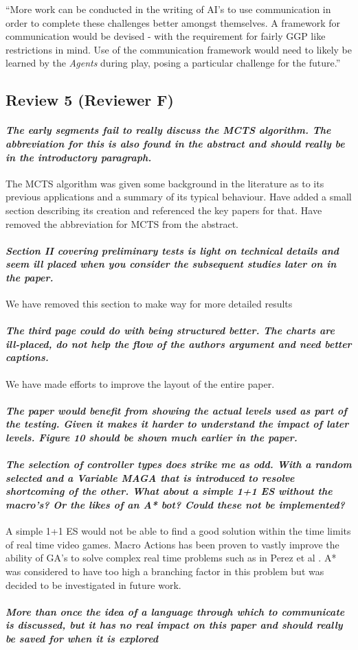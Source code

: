 \documentclass{article}
\begin{document}
``More work can be conducted in the writing of AI's to use communication in order to complete these challenges better amongst themselves. A framework for communication would be devised - with the requirement for fairly GGP like restrictions in mind. Use of the communication framework would need to likely be learned by the \emph{Agents} during play, posing a particular challenge for the future.''
\subsection{Review 5 (Reviewer F)}
\paragraph*{\textit{The early segments fail to really discuss the MCTS algorithm.  The abbreviation for this is also found in the abstract and should really be in the introductory paragraph.}}
The MCTS algorithm was given some background in the literature as to its previous applications and a summary of its typical behaviour. Have added a small section describing its creation and referenced the key papers for that.
Have removed the abbreviation for MCTS from the abstract.
\paragraph*{\textit{Section II covering preliminary tests is light on technical details and seem ill placed when you consider the subsequent studies later on in the paper.}}
We have removed this section to make way for more detailed results
\paragraph*{\textit{The third page could do with being structured better.  The charts are ill-placed, do not help the flow of the authors argument and need better captions.}}
We have made efforts to improve the layout of the entire paper.
\paragraph*{\textit{The paper would benefit from showing the actual levels used as part of the testing.  Given it makes it harder to understand the impact of later levels.  Figure 10 should be shown much earlier in the paper.}}
\paragraph*{\textit{The selection of controller types does strike me as odd.  With a random selected and a Variable MAGA that is introduced to resolve shortcoming of the other.  What about a simple 1+1 ES without the macro's?  Or the likes of an A* bot?  Could these not be implemented?}}
A simple 1+1 ES would not be able to find a good solution within the time limits of real time video games. Macro Actions has been proven to vastly improve the ability of GA's to solve complex real time problems such as in Perez et al \cite{perez2013rolling}. A* was considered to have too high a branching factor in this problem but was decided to be investigated in future work.
\paragraph*{\textit{More than once the idea of a language through which to communicate is discussed, but it has no real impact on this paper and should really be saved for when it is explored}}



\end{document}
